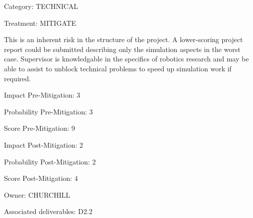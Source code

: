 \documentclass[english]{article}
\begin{document}
Category: TECHNICAL

Treatment: MITIGATE

 This is an inherent risk in the structure of the project. A lower-scoring project report could be submitted describing only the simulation aspects in the worst case.  Supervisor is knowledgable in the specifics of robotics research and may be able to assist to unblock technical problems to speed up simulation work if required.

Impact Pre-Mitigation: 3

Probability Pre-Mitigation: 3

Score Pre-Mitigation: 9

Impact Post-Mitigation: 2

Probability Post-Mitigation: 2

Score Post-Mitigation: 4

Owner: CHURCHILL

Associated deliverables: D2.2 
\end{document}
